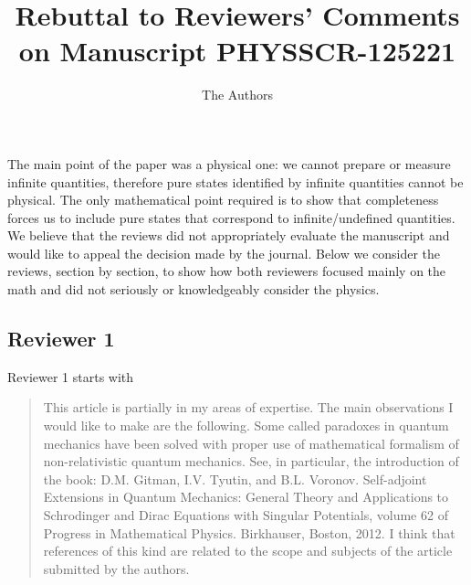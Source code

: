 \documentclass[11pt, executivepaper]{article}
\begin{document}
\title{\textbf{Rebuttal to Reviewers' Comments on Manuscript PHYSSCR-125221}}

\author{The Authors}

\maketitle

The main point of the paper was a physical one: we cannot prepare or measure infinite quantities, therefore pure states identified by infinite quantities cannot be physical. The only mathematical point required is to show that completeness forces us to include pure states that correspond to infinite/undefined quantities. We believe that the reviews did not appropriately evaluate the manuscript and would like to appeal the decision made by the journal. Below we consider the reviews, section by section, to show how both reviewers focused mainly on the math and did not seriously or knowledgeably consider the physics.  


\subsection*{Reviewer 1}

Reviewer 1 starts with
\begin{quote}
This article is partially in my areas of expertise. The main observations I
would like to make are the following.
Some called paradoxes in quantum mechanics have been solved with proper
use of mathematical formalism of non-relativistic quantum mechanics. See,
in particular, the introduction of the book: D.M. Gitman, I.V. Tyutin, and
B.L. Voronov. Self-adjoint Extensions in Quantum Mechanics: General Theory
and Applications to Schrodinger and Dirac Equations with Singular Potentials,
volume 62 of Progress in Mathematical Physics. Birkhauser, Boston, 2012. I
think that references of this kind are related to the scope and subjects of the
article submitted by the authors.
\end{quote}
\end{document}
